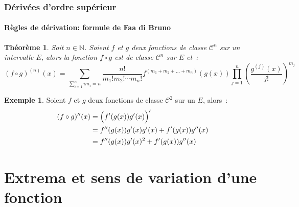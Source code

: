 \documentclass[10pt,notheorems]{beamer}
\theoremstyle{plain}
\newtheorem{theorem}{Théorème}
\theoremstyle{definition} %
\newtheorem{example}{Exemple}
\begin{document}
\begin{frame}
  \frametitle{Dérivées d'ordre supérieur}
  \framesubtitle{Règles de dérivation: formule de Faa di Bruno}
  \hypertarget{slide_derivees_ordre_n_5}{}

  \begin{theorem}\label{thm:faa-di-bruno}
    Soit $n\in\mathbb N$. Soient $f$ et $g$ deux fonctions de classe
    $\mathcal C^n$ sur un intervalle $E$, alors la fonction $f\circ g$
    est de classe $\mathcal C^n$ sur $E$ et~:
    {\small\[
        (f\circ g)^{(n)}(x) = \sum_{\sum_{i=1}^n im_i=n} \frac{n!}{m_1!m_2!\cdots m_n!} f^{(m_1+m_2+\dots+m_n)}(g(x)) \prod_{j=1}^n \left(\frac{g^{(j)}(x)}{j!}\right)^{m_j}
      \]}
  \end{theorem}

  \begin{example}
    Soient $f$ et $g$ deux fonctions de classe $\mathcal C^2$ sur un $E$, alors~:
    \[
      \begin{split}
        (f\circ g)''(x) &= \Bigl(f'(g(x))g'(x)\Bigr)'\\
        &= f''(g(x))g'(x)g'(x)+f'(g(x))g''(x)\\
        &= f''(g(x))g'(x)^2+f'(g(x))g''(x)\\
      \end{split}
    \]
  \end{example}
\end{frame}


\section{Extrema et sens de variation d'une fonction}
\end{document}
